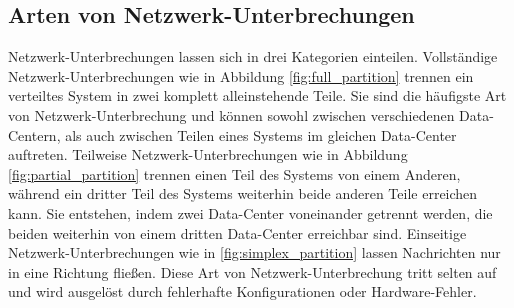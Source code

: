 \documentclass[12pt,a4paper]{report}
\begin{document}
\subsection{Arten von Netzwerk-Unterbrechungen}
Netzwerk-Unterbrechungen lassen sich in drei Kategorien einteilen. Vollständige Netzwerk-Unterbrechungen wie in Abbildung
\ref{fig:full_partition} trennen ein verteiltes System in zwei komplett alleinstehende Teile. Sie sind die häufigste Art von
Netzwerk-Unterbrechung und können sowohl zwischen verschiedenen Data-Centern, als auch zwischen Teilen eines Systems im gleichen
Data-Center auftreten. Teilweise Netzwerk-Unterbrechungen wie in Abbildung \ref{fig:partial_partition} trennen einen Teil des
Systems von einem Anderen, während ein dritter Teil des Systems weiterhin beide anderen Teile erreichen kann. Sie entstehen, indem
zwei Data-Center voneinander getrennt werden, die beiden weiterhin von einem dritten Data-Center erreichbar sind. Einseitige
Netzwerk-Unterbrechungen wie in \ref{fig:simplex_partition} lassen Nachrichten nur in eine Richtung fließen. Diese Art von
Netzwerk-Unterbrechung tritt selten auf und wird ausgelöst durch fehlerhafte Konfigurationen oder Hardware-Fehler.
\cite{analysis_of_network_partition_failures}
\end{document}
